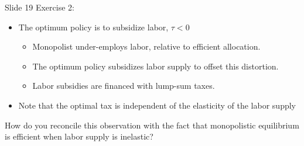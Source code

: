 Slide 19 Exercise 2: 

\begin{itemize}
    \item The optimum policy is to subsidize labor, $\tau<0$
    \begin{itemize}
        \item Monopolist under-employs labor, relative to efficient allocation.
        \item The optimum policy subsidizes labor supply to offset this distortion.
        \item Labor subsidies are financed with lump-sum taxes.
    \end{itemize}
    \item Note that the optimal tax is independent of the elasticity of the labor supply
\end{itemize}

How do you reconcile this observation with the fact that monopolistic equilibrium is efficient when labor supply is inelastic?